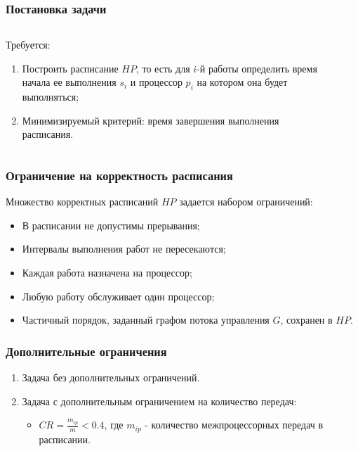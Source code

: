 \begin{frame}
    \frametitle{Постановка задачи}
    \begin{columns}
        \begin{column}{0.7\textwidth}
            Требуется:
            \begin{enumerate}
                \item Построить расписание $HP$, то есть для $i$-й работы определить время начала ее выполнения $s_i$ и процессор $p_i$ на котором она будет выполняться;
                \item Минимизируемый критерий: время завершения выполнения расписания.
            \end{enumerate}
        \end{column}
        \begin{column}{0.3\textwidth}
            \begin{figure}
                \tiny
                \captionsetup{labelformat=empty}
            \end{figure}
        \end{column}
    \end{columns}
\end{frame}

\begin{frame}
    \frametitle{Ограничение на корректность расписания}
    Множество корректных расписаний $HP$ задается набором ограничений:
    \begin{itemize}
        \item В расписании не допустимы прерывания;
        \item Интервалы выполнения работ не пересекаются;
        \item Каждая работа назначена на процессор;
        \item Любую работу обслуживает один процессор;
        \item Частичный порядок, заданный графом потока управления $G$, сохранен в $HP$.
    \end{itemize}
\end{frame}

\begin{frame}
    \frametitle{Дополнительные ограничения}
    \begin{enumerate}
        \item Задача без дополнительных ограничений.
        \item Задача с дополнительным ограничением на количество передач:
              \begin{itemize}
                  \item $CR = \frac{m_{ip}}{m} < 0.4$, где $m_{ip}$ - количество межпроцессорных передач в расписании.
              \end{itemize}
    \end{enumerate}
\end{frame}


